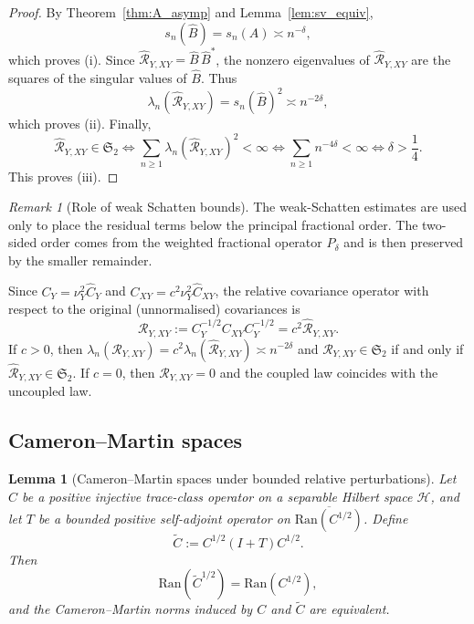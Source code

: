 \documentclass[11pt,a4paper]{amsart}
\theoremstyle{plain}
\newtheorem{lemma}[theorem]{Lemma}
\theoremstyle{definition}
\theoremstyle{remark}
\newtheorem{remark}[theorem]{Remark}
\begin{document}
\begin{proof}
By Theorem~\ref{thm:A_asymp} and Lemma~\ref{lem:sv_equiv},
\[
s_n(\widehat B) = s_n(A) \asymp n^{-\delta},
\]
which proves (i). Since \(\widehat{\mathcal R}_{Y,XY}=\widehat B\,\widehat B^*\), the nonzero eigenvalues of \(\widehat{\mathcal R}_{Y,XY}\) are the
squares of the singular values of $\widehat B$. Thus
\[
\lambda_n(\widehat{\mathcal R}_{Y,XY}) = s_n(\widehat B)^2 \asymp n^{-2\delta},
\]
which proves (ii). Finally,
\[
\widehat{\mathcal R}_{Y,XY} \in \mathfrak S_2
\iff
\sum_{n\ge1} \lambda_n(\widehat{\mathcal R}_{Y,XY})^2 < \infty
\iff
\sum_{n\ge1} n^{-4\delta} < \infty
\iff
\delta > \frac14.
\]
This proves (iii).
\end{proof}

\begin{remark}[Role of weak Schatten bounds]
The weak-Schatten estimates are used only to place the residual terms below the principal fractional
order. The two-sided order comes from the weighted fractional operator $P_\delta$ and is then
preserved by the smaller remainder.
\end{remark}

Since $C_Y=\nu_Y^2\widehat C_Y$ and $C_{XY}=c^2\nu_Y^2\widehat C_{XY}$, the
relative covariance operator with respect to the original (unnormalised) covariances is
\[
\mathcal R_{Y,XY}:=C_Y^{-1/2}C_{XY}C_Y^{-1/2}=c^2\widehat{\mathcal R}_{Y,XY}.
\]
If $c>0$, then \(\lambda_n(\mathcal R_{Y,XY})=c^2\lambda_n(\widehat{\mathcal R}_{Y,XY})\asymp n^{-2\delta}\) and
\(\mathcal R_{Y,XY}\in\mathfrak S_2\) if and only if \(\widehat{\mathcal R}_{Y,XY}\in\mathfrak S_2\). If $c=0$, then \(\mathcal R_{Y,XY}=0\)
and the coupled law coincides with the uncoupled law.

\subsection{Cameron--Martin spaces}

\begin{lemma}[Cameron--Martin spaces under bounded relative perturbations]\label{lem:CM}
Let $C$ be a positive injective trace-class operator on a separable Hilbert space $\mathcal H$, and let $T$ be a bounded positive self-adjoint operator on $\overline{\mathrm{Ran}(C^{1/2})}$. Define
\[
\widetilde C:=C^{1/2}(I+T)C^{1/2}.
\]
Then
\[
\mathrm{Ran}(\widetilde C^{1/2})=\mathrm{Ran}(C^{1/2}),
\]
and the Cameron--Martin norms induced by $C$ and $\widetilde C$ are equivalent.
\end{lemma}
\end{document}
